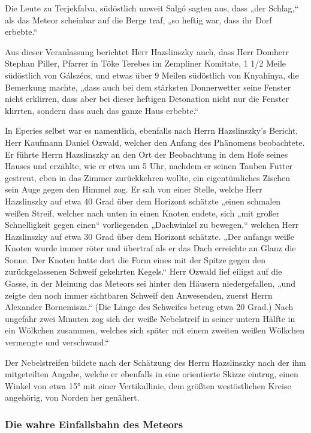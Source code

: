 \documentclass[a4paper, 11pt, oneside, german]{article}
\begin{document}
Die Leute zu Terjekfalva, südöstlich unweit Salgó sagten aus, dass „der Schlag,“ als das Meteor scheinbar auf die Berge traf, „so heftig war, dass ihr Dorf erbebte.“

Aus dieser Veranlassung berichtet Herr Hazslinszky auch, dass Herr Domherr Stephan Piller, Pfarrer in Töke Terebes im Zempliner Komitate, 1 1/2 Meile südöstlich von Gálszécs, und etwas über 9 Meilen südöstlich von Knyahinya, die Bemerkung machte, „dass auch bei dem stärksten Donnerwetter seine Fenster nicht erklirren, dass aber bei dieser heftigen Detonation nicht nur die Fenster klirrten, sondern dass auch das ganze Haus erbebte.“

In Eperies selbst war es namentlich, ebenfalls nach Herrn Hazslinszky's Bericht, Herr Kaufmann Daniel Ozwald, welcher den Anfang des Phänomens beobachtete. Er führte Herrn Hazslinszky an den Ort der Beobachtung in dem Hofe seines Hauses und erzählte, wie er etwa um 5 Uhr, nachdem er seinen Tauben Futter gestreut, eben in das Zimmer zurückkehren wollte, ein eigentümliches Zischen sein Auge gegen den Himmel zog. Er sah von einer Stelle, welche Herr Hazslinszky auf etwa 40 Grad über dem Horizont schätzte „einen schmalen weißen Streif, welcher nach unten in einen Knoten endete, sich „mit großer Schnelligkeit gegen einen“ vorliegenden „Dachwinkel zu bewegen,“ welchen Herr Hazslinszky auf etwa 30 Grad über dem Horizont schätzte. „Der anfangs weiße Knoten wurde immer röter und übertraf als er das Dach erreichte an Glanz die Sonne. Der Knoten hatte dort die Form eines mit der Spitze gegen den zurückgelassenen Schweif gekehrten Kegels.“ Herr Ozwald lief eiligst auf die Gasse, in der Meinung das Meteors sei hinter den Häusern niedergefallen, „und zeigte den noch immer sichtbaren Schweif den Anwesenden, zuerst Herrn Alexander Bornemisza.“ (Die Länge des Schweifes betrug etwa 20 Grad.) Nach ungefähr zwei Minuten zog sich der weiße Nebelstreif in seiner untern Hälfte in ein Wölkchen zusammen, welches sich später mit einem zweiten weißen Wölkchen vermengte und verschwand.“

Der Nebelstreifen bildete nach der Schätzung des Herrn Hazslinszky nach der ihm mitgeteilten Angabe, welche er ebenfalls in eine orientierte Skizze eintrug, einen Winkel von etwa 15° mit einer Vertikallinie, dem größten westöstlichen Kreise angehörig, von Norden her genähert.
\clearpage
\subsubsection{Die wahre Einfallsbahn des Meteors}
\end{document}
